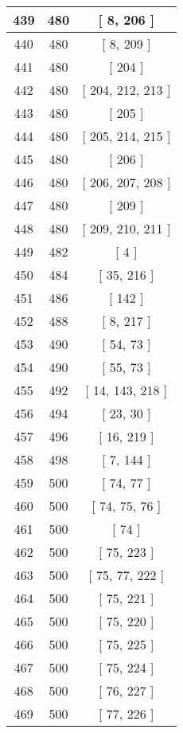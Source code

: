 \begin{center}
\begin{longtable}[H]{|| c c c ||}
439 & 480 & [ 8, 206 ]
\\\hline
440 & 480 & [ 8, 209 ]
\\\hline
441 & 480 & [ 204 ]
\\\hline
442 & 480 & [ 204, 212, 213 ]
\\\hline
443 & 480 & [ 205 ]
\\\hline
444 & 480 & [ 205, 214, 215 ]
\\\hline
445 & 480 & [ 206 ]
\\\hline
446 & 480 & [ 206, 207, 208 ]
\\\hline
447 & 480 & [ 209 ]
\\\hline
448 & 480 & [ 209, 210, 211 ]
\\\hline
449 & 482 & [ 4 ]
\\\hline
450 & 484 & [ 35, 216 ]
\\\hline
451 & 486 & [ 142 ]
\\\hline
452 & 488 & [ 8, 217 ]
\\\hline
453 & 490 & [ 54, 73 ]
\\\hline
454 & 490 & [ 55, 73 ]
\\\hline
455 & 492 & [ 14, 143, 218 ]
\\\hline
456 & 494 & [ 23, 30 ]
\\\hline
457 & 496 & [ 16, 219 ]
\\\hline
458 & 498 & [ 7, 144 ]
\\\hline
459 & 500 & [ 74, 77 ]
\\\hline
460 & 500 & [ 74, 75, 76 ]
\\\hline
461 & 500 & [ 74 ]
\\\hline
462 & 500 & [ 75, 223 ]
\\\hline
463 & 500 & [ 75, 77, 222 ]
\\\hline
464 & 500 & [ 75, 221 ]
\\\hline
465 & 500 & [ 75, 220 ]
\\\hline
466 & 500 & [ 75, 225 ]
\\\hline
467 & 500 & [ 75, 224 ]
\\\hline
468 & 500 & [ 76, 227 ]
\\\hline
469 & 500 & [ 77, 226 ]
\\\hline
\end{longtable}
\end{center}
